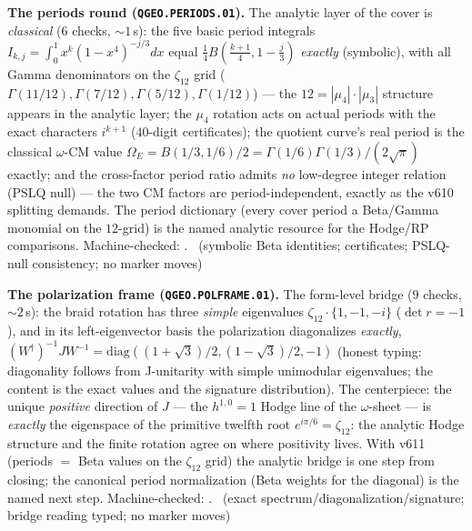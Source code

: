 \documentclass[11pt,a4paper]{article}
\theoremstyle{definition}
\begin{document}
\par\smallskip\noindent\textbf{The periods round
(\texttt{QGEO.PERIODS.01}).}
The analytic layer of the cover is \emph{classical} ($6$ checks,
${\sim}1$\,s): the five basic period integrals
$I_{k,j}=\int_0^1x^k(1-x^4)^{-j/3}dx$ equal
$\tfrac14B(\tfrac{k+1}4,1-\tfrac j3)$ \emph{exactly} (symbolic), with
all Gamma denominators on the $\zeta_{12}$ grid
($\Gamma(11/12),\Gamma(7/12),\Gamma(5/12),\Gamma(1/12)$) --- the
$12=|\mu_4|\cdot|\mu_3|$ structure appears in the analytic layer;
the $\mu_4$ rotation acts on actual periods with the exact
characters $i^{k+1}$ ($40$-digit certificates); the quotient curve's
real period is the classical $\omega$-CM value
$\Omega_E=B(1/3,1/6)/2=\Gamma(1/6)\Gamma(1/3)/(2\sqrt\pi)$ exactly;
and the cross-factor period ratio admits \emph{no} low-degree
integer relation (PSLQ null) --- the two CM factors are
period-independent, exactly as the v610 splitting demands.  The
period dictionary (every cover period a Beta/Gamma monomial on the
$12$-grid) is the named analytic resource for the Hodge/RP
comparisons.
Machine-checked: .
\mE\ (symbolic Beta identities; certificates; PSLQ-null consistency;
no marker moves)
\par\smallskip

\par\smallskip\noindent\textbf{The polarization frame
(\texttt{QGEO.POLFRAME.01}).}
The form-level bridge ($9$ checks, ${\sim}2$\,s): the braid rotation
has three \emph{simple} eigenvalues $\zeta_{12}\cdot\{1,-1,-i\}$
($\det r=-1$), and in its left-eigenvector basis the polarization
diagonalizes \emph{exactly},
$(W^\dagger)^{-1}JW^{-1}=\mathrm{diag}((1{+}\sqrt3)/2,(1{-}\sqrt3)/2,-1)$
(honest typing: diagonality follows from J-unitarity with simple
unimodular eigenvalues; the content is the exact values and the
signature distribution).  The centerpiece: the unique \emph{positive}
direction of $J$ --- the $h^{1,0}=1$ Hodge line of the
$\omega$-sheet --- is \emph{exactly} the eigenspace of the primitive
twelfth root $e^{i\pi/6}=\zeta_{12}$: the analytic Hodge structure
and the finite rotation agree on where positivity lives.  With v611
(periods $=$ Beta values on the $\zeta_{12}$ grid) the analytic
bridge is one step from closing; the canonical period normalization
(Beta weights for the diagonal) is the named next step.
Machine-checked: .
\mE\ (exact spectrum/diagonalization/signature; bridge reading
typed; no marker moves)
\par\smallskip
\end{document}
